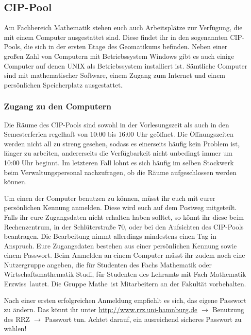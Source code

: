 \subsection{CIP-Pool}

Am Fachbereich Mathematik stehen euch auch Arbeitsplätze zur Verfügung, die mit
einem Computer ausgestattet sind. Diese findet ihr in den sogenannten
CIP-Pools, die sich in der ersten Etage des Geomatikums befinden. Neben einer
großen Zahl von Computern mit Betriebssystem Windows gibt es auch einige
Computer auf denen UNIX als Betriebssystem installiert ist. Sämtliche Computer
sind mit mathematischer Software, einem Zugang zum Internet und einem
persönlichen Speicherplatz ausgestattet.

\subsubsection{Zugang zu den Computern}

Die Räume des CIP-Pools sind sowohl in der Vorlesungszeit als auch in den
Semesterferien regelhaft von 10:00 bis 16:00 Uhr geöffnet. Die Öffnungszeiten
werden nicht all zu streng gesehen, sodass es einerseits häufig kein Problem
ist, länger zu arbeiten, andererseits die Verfügbarkeit nicht unbedingt immer
um 10:00 Uhr beginnt. Im letzteren Fall lohnt es sich häufig im selben
Stockwerk beim Verwaltungspersonal nachzufragen, ob die Räume aufgeschlossen
werden können.

Um einen der Computer benutzen zu können, müsst ihr euch mit eurer persönlichen
Kennung anmelden. Diese wird euch auf dem Postweg mitgeteilt. Falls ihr eure
Zugangsdaten nicht erhalten haben solltet, so könnt ihr diese beim
Rechenzentrum, in der Schlüterstraße 70, oder bei den Aufsichten des CIP-Pools
beantragen. Die Bearbeitung nimmt allerdings mindestens einen Tag in Anspruch.
Eure Zugangsdaten bestehen aus einer persönlichen Kennung sowie einem Passwort.
Beim Anmelden an einem Computer müsst ihr zudem noch eine Nutzergruppe angeben,
die für Studenten des Fachs Mathematik oder Wirtschaftsmathematik \glqq
Studi\grqq, für Studenten des Lehramts mit Fach Mathematik \glqq Erzwiss\grqq\
lautet. Die Gruppe \glqq Mathe\grqq\ ist Mitarbeitern an der Fakultät
vorbehalten.

Nach einer ersten erfolgreichen Anmeldung empfiehlt es sich, das eigene
Passwort zu ändern. Das könnt ihr unter \url{http://www.rrz.uni-hamnburg.de}
$\rightarrow$ Benutzung des RRZ $\rightarrow$ Passwort tun. Achtet darauf, ein
ausreichend sicheres Passwort zu wählen!

